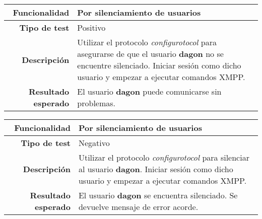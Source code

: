 \documentclass[a4paper,10pt]{article}
\begin{document}
\begin{center}
  \begin{tabular}{|r|p{12.5cm}|}
    \hline
    \textbf{Funcionalidad}	&	Por silenciamiento de usuarios\\
    \hline
    \textbf{Tipo de test}	&	Positivo\\
    \hline
    \textbf{Descripción}	&	Utilizar el protocolo \textit{configurotocol} para asegurarse de que el usuario
					\textbf{dagon} no se encuentre silenciado. Iniciar sesión como dicho
					usuario y empezar a ejecutar comandos XMPP.\\
    \hline
    \textbf{Resultado esperado}	&	El usuario \textbf{dagon} puede comunicarse sin problemas.\\
    \hline   
  \end{tabular}
\end{center}

\begin{center}
  \begin{tabular}{|r|p{12.5cm}|}
    \hline
    \textbf{Funcionalidad}	&	Por silenciamiento de usuarios\\
    \hline
    \textbf{Tipo de test}	&	Negativo\\
    \hline
    \textbf{Descripción}	&	Utilizar el protocolo \textit{configurotocol} para silenciar al usuario
					\textbf{dagon}. Iniciar sesión como dicho usuario y empezar a ejecutar
					comandos XMPP.\\
    \hline
    \textbf{Resultado esperado}	&	El usuario \textbf{dagon} se encuentra silenciado. Se devuelve mensaje
					de error acorde.\\
    \hline   
  \end{tabular}
\end{center}
\end{document}
